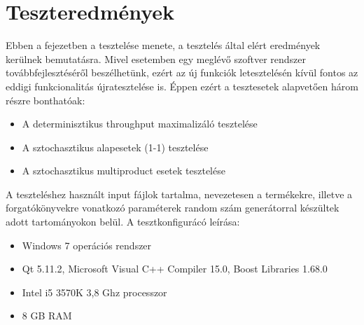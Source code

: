 \chapter{Teszteredmények}
Ebben a fejezetben a tesztelése menete, a tesztelés által elért eredmények kerülnek bemutatásra.
Mivel esetemben egy meglévő szoftver rendszer továbbfejlesztéséről beszélhetünk, ezért az új funkciók letesztelésén kívül fontos az eddigi funkcionalitás újratesztelése is.
Éppen ezért a tesztesetek alapvetően három részre bonthatóak:
\begin{itemize}
\item A determinisztikus throughput maximalizáló tesztelése
\item A sztochasztikus alapesetek (1-1) tesztelése
\item A sztochasztikus multiproduct esetek tesztelése
\end{itemize}
A teszteléshez használt input fájlok tartalma, nevezetesen a termékekre, illetve a forgatókönyvekre vonatkozó paraméterek random szám generátorral készültek adott tartományokon belül.
A tesztkonfigurácó leírása:
\begin{itemize}
\item Windows 7 operációs rendszer 
\item Qt 5.11.2, Microsoft Visual C++ Compiler 15.0, Boost Libraries 1.68.0
\item Intel i5 3570K 3,8 Ghz processzor
\item 8 GB RAM
\end{itemize}
